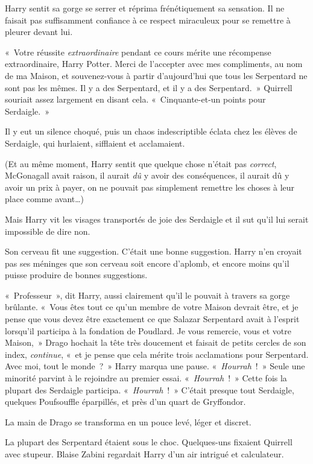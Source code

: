 Harry sentit sa gorge se serrer et réprima frénétiquement sa sensation.
Il ne faisait pas suffisamment confiance à ce respect miraculeux pour se remettre à pleurer devant lui.

«~Votre réussite \emph{extraordinaire} pendant ce cours mérite une récompense extraordinaire, Harry Potter.
Merci de l'accepter avec mes compliments, au nom de ma Maison, et souvenez-vous à partir d'aujourd'hui que tous les Serpentard ne sont pas les mêmes.
Il y a des Serpentard, et il y a des Serpentard.~»
Quirrell souriait assez largement en disant cela.
«~Cinquante-et-un points pour Serdaigle.~»

Il y eut un silence choqué, puis un chaos indescriptible éclata chez les élèves de Serdaigle, qui hurlaient, sifflaient et acclamaient.

(Et au même moment, Harry sentit que quelque chose n'était pas \emph{correct}, McGonagall avait raison, il aurait \emph{dû} y avoir des conséquences, il aurait dû y avoir un prix à payer, on ne pouvait pas simplement remettre les choses à leur place comme avant…)

Mais Harry vit les visages transportés de joie des Serdaigle et il sut qu'il lui serait impossible de dire non.

Son cerveau fit une suggestion.
C'était une bonne suggestion.
Harry n'en croyait pas ses méninges que son cerveau soit encore d'aplomb, et encore moins qu'il puisse produire de bonnes suggestions.

«~Professeur~», dit Harry, aussi clairement qu'il le pouvait à travers sa gorge brûlante.
«~Vous êtes tout ce qu'un membre de votre Maison devrait être, et je pense que vous devez être exactement ce que Salazar Serpentard avait à l'esprit lorsqu'il participa à la fondation de Poudlard.
Je vous remercie, vous et votre Maison,~» Drago hochait la tête très doucement et faisait de petits cercles de son index, \emph{continue}, «~et je pense que cela mérite trois acclamations pour Serpentard.
Avec moi, tout le monde~?~»
Harry marqua une pause.
«~\emph{Hourrah}~!~»
Seule une minorité parvint à le rejoindre au premier essai.
«~\emph{Hourrah}~!~»
Cette fois la plupart des Serdaigle participa.
«~\emph{Hourrah}~!~»
C'était presque tout Serdaigle, quelques Poufsouffle éparpillés, et près d'un quart de Gryffondor.

La main de Drago se transforma en un pouce levé, léger et discret.

La plupart des Serpentard étaient sous le choc.
Quelques-uns fixaient Quirrell avec stupeur.
Blaise Zabini regardait Harry d'un air intrigué et calculateur.

